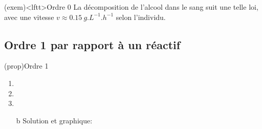 \documentclass[../../main/main.tex]{subfiles}
\begin{document}
\begin{tcb}(exem)<lftt>{Ordre 0}
	La décomposition de l'alcool dans le sang suit une telle loi, avec une vitesse
	$v \approx \SI{0.15}{g.L^{-1}.h^{-1}}$ selon l'individu.
\end{tcb}

\subsection{Ordre 1 par rapport à un réactif}

\begin{tcb*}(prop){Ordre 1}
	\begin{enumerate}
		\item {}
		\item {}
		\item {}
		\item[b]{Solution et graphique}:
		      \smallbreak
		      \begin{isd}
			      \psw{%
			      \[
				      [\ce{A}](t) = [\ce{A}]_0\exp(-\abs{\nu_{\ce{A}}k t})
			      \]
			      }%
			      \tcblower
			      \begin{center}
\end{center}
\end{isd}
\end{enumerate}
\end{tcb*}
\end{document}
